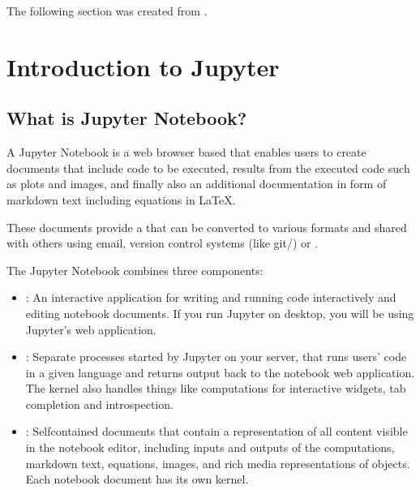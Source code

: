 \documentclass[letterpaper,10pt,english]{sphinxmanual}
\begin{document}
The following section was created from .


\section{Introduction to Jupyter}
\label{\detokenize{notebooks/Intro/Introduction2Jupyter:Introduction-to-Jupyter}}\label{\detokenize{notebooks/Intro/Introduction2Jupyter::doc}}

\subsection{What is Jupyter Notebook?}
\label{\detokenize{notebooks/Intro/Introduction2Jupyter:What-is-Jupyter-Notebook?}}
A Jupyter Notebook is a web browser based  that enables users to create documents that include code to be executed, results from the executed code such as plots and images, and finally also an additional documentation in form of markdown text including equations in LaTeX.

These documents provide a  that can be converted to various formats and shared with others using email, version control systems (like git/) or .

The Jupyter Notebook combines three components:
\begin{itemize}
\item {} 
: An interactive application for writing and running code interactively and editing notebook documents. If you run Jupyter on desktop, you will be using Jupyter’s web application.

\item {} 
: Separate processes started by Jupyter on your server, that runs users’ code in a given language and returns output back to the notebook web application. The kernel also handles things like computations for interactive widgets, tab completion and introspection.

\item {} 
: Self\sphinxhyphen{}contained documents that contain a representation of all content visible in the notebook editor, including inputs and outputs of the computations, markdown text, equations, images, and rich media representations of objects. Each notebook document has its own kernel.

\end{itemize}
\end{document}
